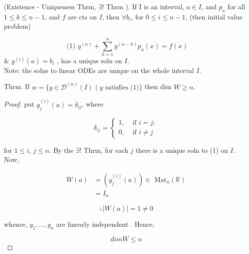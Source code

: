 



\hrulefill
\begin{theorem}
  (Existence - Uniqueness Thrm, \( \exists \)! Thrm ). If I is an
  interval, \( a \in I \), and \( p_u \) for all \( 1 \leq k \leq n-1 \),
  and \( f \) are cts on \( I \), then 
  \( \forall b_i \), for \( 0 \leq i \leq n-1 \), (then initial value problem)  
\end{theorem}

\[ \text{ (1) } y^{(n)} + \sum_{k=1}^n y^{(n-k)} p_u(x) = f(x) \]
\& \( y^{(i)} (a) = b_i  \) , has a unique soln on \( I \). \\
Note: the solns to linear ODEs are unique on the whole interval \( I
\).\\[5mm]

\begin{theorem}
  Thrm. If \( w = \{ y \in \mathscr{D}^{(n)} (I) \text{ | } y \text{ satisfies (1)}
  \} \) then
  dim \( W \geq n \). \\[5mm]
\end{theorem}

\begin{proof}
  put \( y^{(i)}_j (a) = \delta_{ij} \),  where

  \[ 
  \delta_{ij} =
  \begin{cases}
    1, & \text{ if } i = j; \\
    0, & \text{ if } i \neq j
  \end{cases}
  \]

  for \( 1 \leq i \), \( j \leq n \). By the \( \exists \)! Thrm, for each
  \( j \) there is a unique soln to (1) on \( I \). Now, 

  \begin{align*}
    W(a) &= (y_j^{(i)}(a) ) \in \text{ Mat}_n( \mathbb{R}) \\
    &= I_n
  \end{align*}

  \[ \therefore |W(a)|=1 \neq 0 \]

  whence, \( y_1, \dots , y_n \) are linearly independent . Hence,

  \[ dim W \leq n  \]
\end{proof}

